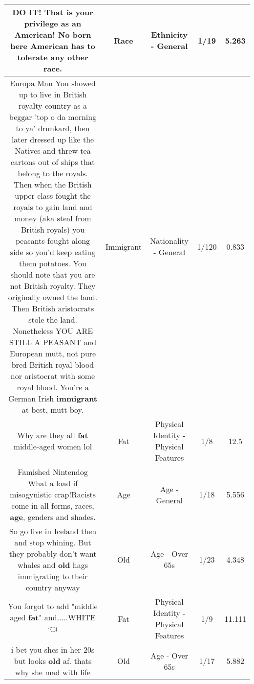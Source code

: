 \documentclass[11pt]{article}
\newlength\mylength
\begin{document}
\begin{center}
\begin{longtable}{|C{.65\mylength}|C{.30\mylength}|C{.12\mylength}|C{.12\mylength}|C{.12\mylength}|}
  \small DO IT! That is your privilege as an American! No born here American has to tolerate any other \textbf{race}.\normalsize   & Race & Ethnicity - General & 1/19 & 5.263 \\  \hline
  \small Europa Man You showed up to live in British royalty country as a beggar 'top o da morning to ya' drunkard, then later dressed up like the Natives and threw tea cartons out of ships that belong to the royals. Then when the British upper class fought the royals to gain land and money (aka steal from British royals) you peasants fought along side so you'd keep eating them potatoes. You should note that you are not British royalty. They originally owned the land. Then British aristocrats stole the land. Nonetheless YOU ARE STILL A PEASANT and European mutt, not pure bred British royal blood nor aristocrat with some royal blood. You're a German Irish \textbf{immigrant} at best, mutt boy.\normalsize   & Immigrant & Nationality - General & 1/120 & 0.833 \\  \hline
  \small Why are they all \textbf{fat} middle-aged women lol\normalsize   & Fat & Physical Identity - Physical Features & 1/8 & 12.5 \\  \hline
  \small Famished Nintendog What a load if misogynistic crap!Racists come in all forms, races, \textbf{age}, genders and shades.\normalsize   & Age & Age - General & 1/18 & 5.556 \\  \hline
  \small So go live in Iceland then and stop whining. But they probably don't want whales and \textbf{old} hags immigrating to their country anyway\normalsize   & Old & Age - Over 65s & 1/23 & 4.348 \\  \hline
  \small You forgot to add "middle aged \textbf{fat}" and.....WHITE 👈\normalsize   & Fat & Physical Identity - Physical Features & 1/9 & 11.111 \\  \hline
  \small i bet you shes in her 20s but looks \textbf{old} af. thats why she mad with life\normalsize   & Old & Age - Over 65s & 1/17 & 5.882 \\  \hline

\end{longtable}
\end{center}
\end{document}
